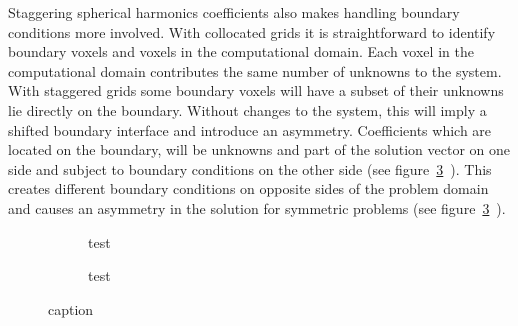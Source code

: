 Staggering spherical harmonics coefficients also makes handling boundary conditions more involved. With collocated grids it is straightforward to identify boundary voxels and voxels in the computational domain. Each voxel in the computational domain contributes the same number of unknowns to the system. With staggered grids some boundary voxels will have a subset of their unknowns lie directly on the boundary. Without changes to the system, this will imply a shifted boundary interface and introduce an asymmetry. Coefficients which are located on the boundary, will be unknowns and part of the solution vector on one side and subject to boundary conditions on the other side (see figure~\ref{fig:pn_staggered_grid_unhandled_bc}~). This creates different boundary conditions on opposite sides of the problem domain and causes an asymmetry in the solution for symmetric problems (see figure~\ref{fig:pn_staggered_grid_unhandled_bc}~).
\begin{figure}[h]
\centering
\begin{subfigure}{0.49\columnwidth}
\caption{test}
\label{fig:pn_staggering_asymmetry_bc}
\end{subfigure}%
\hspace{0.01\columnwidth}
\begin{subfigure}{0.49\columnwidth}
\caption{test}
\label{fig:pn_staggering_asymmetry_bc_checkerboard}
\end{subfigure}%
\caption{caption}
\label{fig:pn_staggered_grid_unhandled_bc}
\end{figure}

